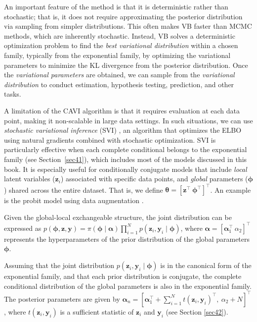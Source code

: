 An important feature of the method is that it is deterministic rather than stochastic; that is, it does not require approximating the posterior distribution via sampling from simpler distributions. This often makes VB faster than MCMC methods, which are inherently stochastic. Instead, VB solves a deterministic optimization problem to find the \textit{best variational distribution} within a chosen family, typically from the exponential family, by optimizing the variational parameters to minimize the KL divergence from the posterior distribution. Once the \textit{variational parameters} are obtained, we can sample from the \textit{variational distribution} to conduct estimation, hypothesis testing, prediction, and other tasks.

A limitation of the CAVI algorithm is that it requires evaluation at each data point, making it non-scalable in large data settings. In such situations, we can use \textit{stochastic variational inference} (SVI) \cite{hoffman2013stochastic}, an algorithm that optimizes the ELBO using natural gradients combined with stochastic optimization. SVI is particularly effective when each complete conditional belongs to the exponential family (see Section~\ref{sec41}), which includes most of the models discussed in this book. It is especially useful for conditionally conjugate models that include \textit{local} latent variables ($\boldsymbol{z}_i$) associated with specific data points, and \textit{global} parameters ($\boldsymbol{\phi}$) shared across the entire dataset. That is, we define $\boldsymbol\theta = [\boldsymbol{z}^{\top} \ \boldsymbol{\phi}^{\top}]^{\top}$. An example is the probit model using data augmentation \cite{Tanner1987}.

Given the global-local exchangeable structure, the joint distribution can be expressed as $p(\boldsymbol{\phi}, \boldsymbol{z}, \boldsymbol{y}) = \pi(\boldsymbol{\phi} \mid \boldsymbol{\alpha}) \prod_{i=1}^{N} p(\boldsymbol{z}_i, \boldsymbol{y}_i \mid \boldsymbol{\phi})$, where $\boldsymbol{\alpha} = [\boldsymbol{\alpha}_1^{\top} \ \alpha_2]^{\top}$ represents the hyperparameters of the prior distribution of the global parameters $\boldsymbol{\phi}$.

Assuming that the joint distribution $p(\boldsymbol{z}_i, \boldsymbol{y}_i \mid \boldsymbol{\phi})$ is in the canonical form of the exponential family, and that each prior distribution is conjugate, the complete conditional distribution of the global parameters is also in the exponential family. The posterior parameters are given by $\boldsymbol{\alpha}_n = [\boldsymbol{\alpha}_1^{\top} + \sum_{i=1}^N t(\boldsymbol{z}_i, \boldsymbol{y}_i)^{\top}, \ \alpha_2 + N]^{\top}$, where $t(\boldsymbol{z}_i, \boldsymbol{y}_i)$ is a sufficient statistic of $\boldsymbol{z}_i$ and $\boldsymbol{y}_i$ (see Section \ref{sec42}).

